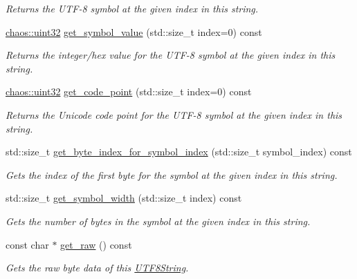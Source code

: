 \begin{DoxyCompactItemize}
\begin{DoxyCompactList}\small\item\em Returns the U\-T\-F-\/8 symbol at the given index in this string. \end{DoxyCompactList}\item 
\hyperlink{namespacechaos_a8641b3ae4551f0b35570d4f9f4ec22d9}{chaos\-::uint32} \hyperlink{classchaos_1_1uni_1_1_u_t_f8_string_a2787c287f4fdaa0b4f2c1c7eccbf8f99}{get\-\_\-symbol\-\_\-value} (std\-::size\-\_\-t index=0) const 
\begin{DoxyCompactList}\small\item\em Returns the integer/hex value for the U\-T\-F-\/8 symbol at the given index in this string. \end{DoxyCompactList}\item 
\hyperlink{namespacechaos_a8641b3ae4551f0b35570d4f9f4ec22d9}{chaos\-::uint32} \hyperlink{classchaos_1_1uni_1_1_u_t_f8_string_a20b2a700379ac8ba32882d99b8a2a539}{get\-\_\-code\-\_\-point} (std\-::size\-\_\-t index=0) const 
\begin{DoxyCompactList}\small\item\em Returns the Unicode code point for the U\-T\-F-\/8 symbol at the given index in this string. \end{DoxyCompactList}\item 
std\-::size\-\_\-t \hyperlink{classchaos_1_1uni_1_1_u_t_f8_string_a1c8f623ae90b3ebbd28a95135e5c81f0}{get\-\_\-byte\-\_\-index\-\_\-for\-\_\-symbol\-\_\-index} (std\-::size\-\_\-t symbol\-\_\-index) const 
\begin{DoxyCompactList}\small\item\em Gets the index of the first byte for the symbol at the given index in this string. \end{DoxyCompactList}\item 
std\-::size\-\_\-t \hyperlink{classchaos_1_1uni_1_1_u_t_f8_string_a5043fb9645ef29de2b11b69186ec4132}{get\-\_\-symbol\-\_\-width} (std\-::size\-\_\-t index) const 
\begin{DoxyCompactList}\small\item\em Gets the number of bytes in the symbol at the given index in this string. \end{DoxyCompactList}\item 
const char $\ast$ \hyperlink{classchaos_1_1uni_1_1_u_t_f8_string_a91d3bb4cfbfb573b3fa6ecf3312f4dee}{get\-\_\-raw} () const 
\begin{DoxyCompactList}\small\item\em Gets the raw byte data of this \hyperlink{classchaos_1_1uni_1_1_u_t_f8_string}{U\-T\-F8\-String}. \end{DoxyCompactList}\item 

\end{DoxyCompactItemize}

